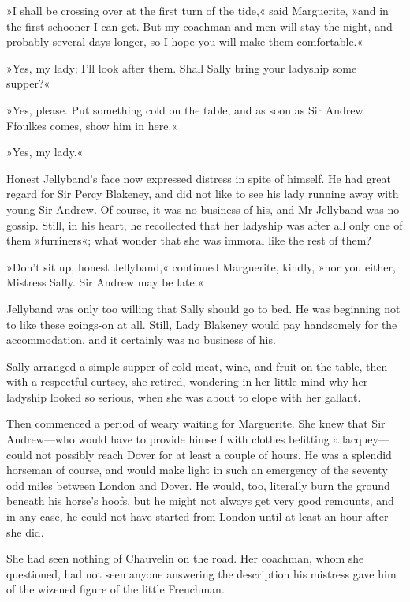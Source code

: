»I shall be crossing over at the first turn of the tide,« said Marguerite, »and in the first schooner I can get. But my coachman and men will stay the night, and probably several days longer, so I hope you will make them comfortable.«

»Yes, my lady; I'll look after them. Shall Sally bring your ladyship some supper?«

»Yes, please. Put something cold on the table, and as soon as Sir Andrew Ffoulkes comes, show him in here.«

»Yes, my lady.«

Honest Jellyband's face now expressed distress in spite of himself. He had great regard for Sir Percy Blakeney, and did not like to see his lady running away with young Sir Andrew. Of course, it was no business of his, and Mr Jellyband was no gossip. Still, in his heart, he recollected that her ladyship was after all only one of them »furriners«; what wonder that she was immoral like the rest of them?

»Don't sit up, honest Jellyband,« continued Marguerite, kindly, »nor you either, Mistress Sally. Sir Andrew may be late.«

Jellyband was only too willing that Sally should go to bed. He was beginning not to like these goings-on at all. Still, Lady Blakeney would pay handsomely for the accommodation, and it certainly was no business of his.

Sally arranged a simple supper of cold meat, wine, and fruit on the table, then with a respectful curtsey, she retired, wondering in her little mind why her ladyship looked so serious, when she was about to elope with her gallant.

Then commenced a period of weary waiting for Marguerite. She knew that Sir Andrew\allowbreak---\allowbreak who would have to provide himself with clothes befitting a lacquey\allowbreak---\allowbreak could not possibly reach Dover for at least a couple of hours. He was a splendid horseman of course, and would make light in such an emergency of the seventy odd miles between London and Dover. He would, too, literally burn the ground beneath his horse's hoofs, but he might not always get very good remounts, and in any case, he could not have started from London until at least an hour after she did.

She had seen nothing of Chauvelin on the road. Her coachman, whom she questioned, had not seen anyone answering the description his mistress gave him of the wizened figure of the little Frenchman.


